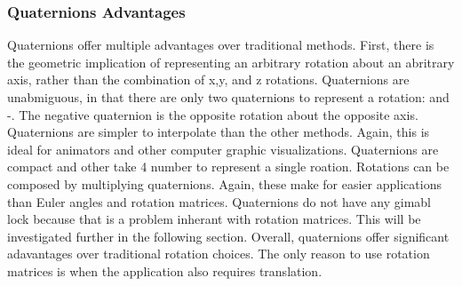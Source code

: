 \subsubsection{Quaternions Advantages}
Quaternions offer multiple advantages over traditional methods.
First, there is the geometric implication of representing an arbitrary rotation about an abritrary axis, rather than the combination of x,y, and z rotations.
Quaternions are unabmiguous, in that there are only two quaternions to represent a rotation: \qq and -\qq.
The negative quaternion is the opposite rotation about the opposite axis.
Quaternions are simpler to interpolate than the other methods.
Again, this is ideal for animators and other computer graphic visualizations.
Quaternions are compact and other take 4 number to represent a single roation.
Rotations can be composed by multiplying quaternions.
Again, these make for easier applications than Euler angles and rotation matrices.
Quaternions do not have any gimabl lock because that is a problem inherant with rotation matrices.
This will be investigated further in the following section.
Overall, quaternions offer significant adavantages over traditional rotation choices.
The only reason to use rotation matrices is when the application also requires translation.
